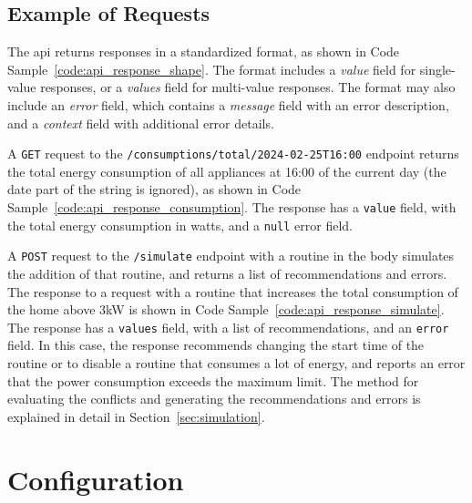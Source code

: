 \newpage

\subsection{Example of Requests}



The \acrshort{api} returns responses in a standardized format, as shown in Code Sample~\ref{code:api_response_shape}. The format includes a \textit{value} field for single-value responses, or a \textit{values} field for multi-value responses. The format may also include an \textit{error} field, which contains a \textit{message} field with an error description, and a \textit{context} field with additional error details.



A \texttt{GET} request to the \texttt{/consumptions/total/2024-02-25T16:00} endpoint returns the total energy consumption of all appliances at 16:00 of the current day (the date part of the string is ignored), as shown in Code Sample~\ref{code:api_response_consumption}. The response has a \texttt{value} field, with the total energy consumption in watts, and a \texttt{null} error field.



A \texttt{POST} request to the \texttt{/simulate} endpoint with a routine in the body simulates the addition of that routine, and returns a list of recommendations and errors. The response to a request with a routine that increases the total consumption of the home above 3kW is shown in Code Sample~\ref{code:api_response_simulate}. The response has a \texttt{values} field, with a list of recommendations, and an \texttt{error} field. In this case, the response recommends changing the start time of the routine or to disable a routine that consumes a lot of energy, and reports an error that the power consumption exceeds the maximum limit. The method for evaluating the conflicts and generating the recommendations and errors is explained in detail in Section~\ref{sec:simulation}.

\section{Configuration}



